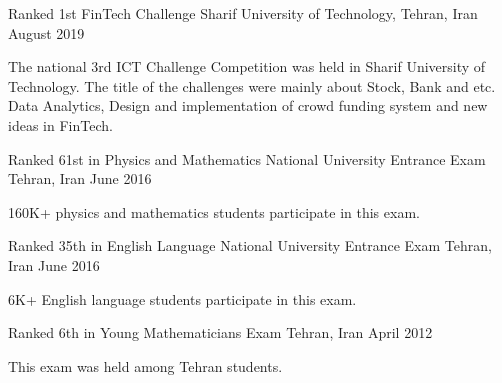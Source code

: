 \begin{cventries}
	
  \cventry
	{}
	{Ranked 1st FinTech Challenge}
	{Sharif University of Technology, Tehran, Iran}
	{August 2019}
	{
		\begin{cvitems}
			{
				The national 3rd ICT Challenge Competition was held in Sharif University of Technology. The title of the challenges were mainly about Stock, Bank and etc. Data Analytics, Design and implementation of crowd funding system and new ideas in FinTech.
			}
		\end{cvitems}
	}
  \cventry
    {}
    {Ranked 61st in Physics and Mathematics National University Entrance Exam}
    {Tehran, Iran}
    {June 2016}
    {
      \begin{cvitems}
        {160K+ physics and mathematics students participate in this exam. }
      \end{cvitems}
    }
    \cventry
    {}
    {Ranked 35th in English Language National University Entrance Exam}
    {Tehran, Iran}
    {June 2016}
    {
      \begin{cvitems}
         {6K+ English language students participate in this exam. }
      \end{cvitems}
    }
  \cventry
    {}
    {Ranked 6th in Young Mathematicians Exam}
    {Tehran, Iran}
    {April 2012}
    {
      \begin{cvitems}
         {This exam was held among Tehran students. }
      \end{cvitems}
    }
\end{cventries}
